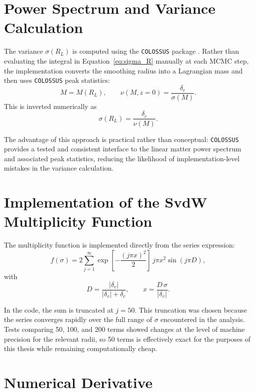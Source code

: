 \documentclass[12pt]{report}
\begin{document}
\section{Power Spectrum and Variance Calculation}
\label{app:vdn_power}

The variance $\sigma(R_L)$ is computed using the \texttt{COLOSSUS} package \citep{Diemer2018}. Rather than evaluating the integral in Equation~\ref{eq:sigma_R} manually at each MCMC step, the implementation converts the smoothing radius into a Lagrangian mass and then uses \texttt{COLOSSUS} peak statistics:
\begin{equation}
    M = M(R_L), \qquad \nu(M,z=0) = \frac{\delta_c}{\sigma(M)}.
\end{equation}
This is inverted numerically as
\begin{equation}
    \sigma(R_L) = \frac{\delta_c}{\nu(M)}.
\end{equation}

The advantage of this approach is practical rather than conceptual: \texttt{COLOSSUS} provides a tested and consistent interface to the linear matter power spectrum and associated peak statistics, reducing the likelihood of implementation-level mistakes in the variance calculation.

\section{Implementation of the SvdW Multiplicity Function}

The multiplicity function is implemented directly from the series expression:
\begin{equation}
    f(\sigma) = 2 \sum_{j=1}^{\infty} \exp\!\left[-\frac{(j\pi x)^2}{2}\right]\,j\pi x^2 \sin(j\pi D),
\end{equation}
with
\begin{equation}
    D = \frac{|\delta_v|}{|\delta_v|+\delta_c},
    \qquad
    x = \frac{D\,\sigma}{|\delta_v|}.
\end{equation}

In the code, the sum is truncated at $j=50$. This truncation was chosen because the series converges rapidly over the full range of $\sigma$ encountered in the analysis. Tests comparing 50, 100, and 200 terms showed changes at the level of machine precision for the relevant radii, so 50 terms is effectively exact for the purposes of this thesis while remaining computationally cheap.

\section{Numerical Derivative}
\label{app:vdn_derivative}
\end{document}
